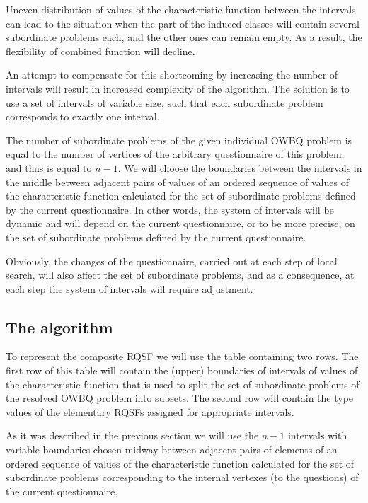 \documentclass[11pt]{article}
\begin{document}
Uneven distribution of values of the characteristic function between the intervals can lead to the situation when the part of the induced classes will contain several subordinate problems each, and the other ones can remain empty. As a result, the flexibility of combined function will decline.

An attempt to compensate for this shortcoming by increasing the number of intervals will result in increased complexity of the algorithm. The solution is to use a set of intervals of variable size, such that each subordinate problem corresponds to exactly one interval.

The number of subordinate problems of the given individual OWBQ problem is equal to the number of vertices of the arbitrary questionnaire of this problem, and thus is equal to $n-1$. We will choose the boundaries between the intervals in the middle between adjacent pairs of values of an ordered sequence of values of the characteristic function calculated for the set of subordinate problems defined by the current questionnaire. In other words, the system of intervals will be dynamic and will depend on the current questionnaire, or to be more precise, on the set of subordinate problems defined by the current questionnaire. 

Obviously, the changes of the questionnaire, carried out at each step of local search, will also affect the set of subordinate problems, and as a consequence, at each step the system of intervals will require adjustment.

%
%
%
\subsection{The algorithm}
To represent the composite RQSF we will use the table containing two rows. The first row of this table will contain the (upper) boundaries of intervals of values of the characteristic function that is used to split the set of subordinate problems of the resolved OWBQ problem into subsets. The second row will contain the type values of the elementary RQSFs assigned for appropriate intervals. 

As it was described in the previous section we will use the $n-1$ intervals with variable boundaries chosen midway between adjacent pairs of elements of an ordered sequence of values of the characteristic function calculated for the set of subordinate problems corresponding to the internal vertexes (to the questions) of the current questionnaire.
\end{document}
